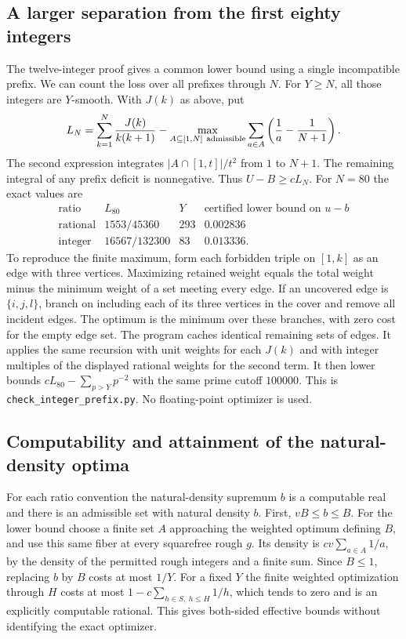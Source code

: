 \subsection{A larger separation from the first eighty integers}
The twelve-integer proof gives a common lower bound using a single incompatible prefix. We can count the loss over all prefixes through $N$. For $Y\ge N$, all those integers are $Y$-smooth. With $J(k)$ as above, put
\[
 L_N=\sum_{k=1}^N\frac{J(k)}{k(k+1)}
      -\max_{A\subseteq[1,N]\ {\rm admissible}}
              \sum_{a\in A}\left(\frac1a-\frac1{N+1}\right).
\]
The second expression integrates $|A\cap[1,t]|/t^2$ from $1$ to $N+1$.
The remaining integral of any prefix deficit is nonnegative. Thus $U-B\ge cL_N$. For $N=80$ the exact values are
\[
 \begin{array}{lrrl}
 \text{ratio}&L_{80}&Y&\text{certified lower bound on }u-b\\\hline
 \text{rational}&1553/45360&293&0.002836\\
 \text{integer}&16567/132300&83&0.013336 .
 \end{array}
\]
To reproduce the finite maximum, form each forbidden triple on $[1,k]$ as an edge with three vertices. Maximizing retained weight equals the total weight minus the minimum weight of a set meeting every edge. If an uncovered edge is $\{i,j,l\}$, branch on including each of its three vertices in the cover and remove all incident edges. The optimum is the minimum over these branches, with zero cost for the empty edge set. The program caches identical remaining sets of edges. It applies the same recursion with unit weights for each $J(k)$ and with integer multiples of the displayed rational weights for the second term. It then lower bounds $cL_{80}-\sum_{p>Y}p^{-2}$ with the same prime cutoff $100000$. This is \texttt{check\_integer\_prefix.py}. No floating-point optimizer is used.

\subsection{Computability and attainment of the natural-density optima}
For each ratio convention the natural-density supremum $b$ is a computable real and there is an admissible set with natural density $b$.
First, $vB\le b\le B$. For the lower bound choose a finite set $A$ approaching the weighted optimum defining $B$, and use this same fiber at every squarefree rough $g$. Its density is $cv\sum_{a\in A}1/a$, by the density of the permitted rough integers and a finite sum. Since $B\le1$, replacing $b$ by $B$ costs at most $1/Y$. For a fixed $Y$ the finite weighted optimization through $H$ costs at most $1-c\sum_{h\in S,\ h\le H}1/h$, which tends to zero and is an explicitly computable rational. This gives both-sided effective bounds without identifying the exact optimizer.

